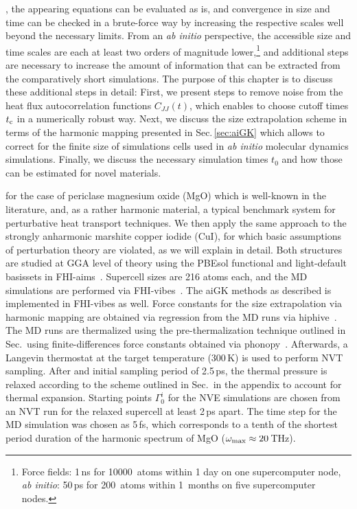 , the appearing equations can be evaluated as is, and convergence in size and time can be checked in a brute-force way by increasing the respective scales well beyond the necessary limits. From an \emph{ab initio} perspective, the accessible size and time scales are each at least two orders of magnitude lower,\footnote{Force fields: 1\,ns for 10000~atoms within 1 day on one supercomputer node, \emph{ab initio}: 50\,ps for 200~atoms within 1~months on five supercomputer nodes.} and additional steps are necessary to increase the amount of information that can be extracted from the comparatively short simulations. The purpose of this chapter is to discuss these additional steps in detail: First, we present steps to remove noise from the heat flux autocorrelation functions $C_{JJ} (t)$, which enables to choose cutoff times $t_{\rm c}$ in a numerically robust way. Next, we discuss the size extrapolation scheme in terms of the harmonic mapping presented in Sec.\,\ref{sec:aiGK} which allows to correct for the finite size of simulations cells used in \emph{ab initio} molecular dynamics simulations. Finally, we discuss the necessary simulation times $t_0$ and how those can be estimated for novel materials.

 for the case of periclase magnesium oxide (MgO) which is well-known in the literature, and, as a rather harmonic material, a typical benchmark system for perturbative heat transport techniques. We then apply the same approach to the strongly anharmonic marshite copper iodide (CuI), for which basic assumptions of perturbation theory are violated, as we will explain in detail. 
Both structures are studied at GGA level of theory using the PBEsol functional and light-default basissets in FHI-aims~. Supercell sizes are 216 atoms each, and the MD simulations are performed via FHI-vibes~. The aiGK methods as described is implemented in FHI-vibes as well. Force constants for the size extrapolation via harmonic mapping are obtained via regression from the MD runs via hiphive~. The MD runs are thermalized using the pre-thermalization technique outlined in Sec.\, using finite-differences force constants obtained via phonopy~. Afterwards, a Langevin thermostat at the target temperature (300\,K) is used to perform NVT sampling. After and initial sampling period of 2.5\,ps, the thermal pressure is relaxed according to the scheme outlined in Sec.\, in the appendix to account for thermal expansion. Starting points $\Gamma^i_0$ for the NVE simulations are chosen from an NVT run for the relaxed supercell at least 2\,ps apart. The time step for the MD simulation was chosen as 5\,fs, which corresponds to a tenth of the shortest period duration of the harmonic spectrum of MgO ($\omega_{\rm max} \approx 20$\,THz).


